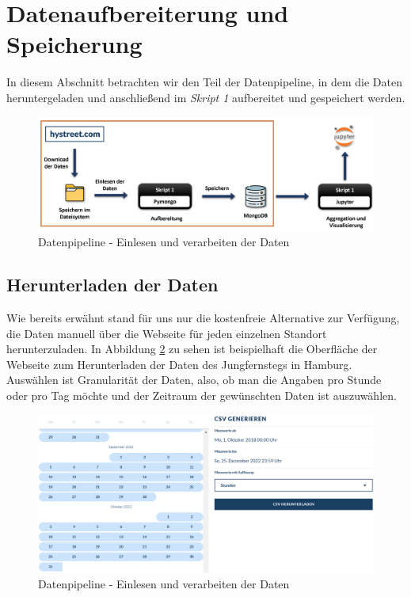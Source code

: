 \section{Datenaufbereiterung und Speicherung}
In diesem Abschnitt betrachten wir den Teil der Datenpipeline, in dem die Daten heruntergeladen und anschließend im \emph{Skript 1} aufbereitet und gespeichert werden.

\begin{figure}[h!]
    \vspace{0.7cm}
    \centering
    \includegraphics[width=0.8\linewidth]{images/datenpipelineT1.png}
    \caption{Datenpipeline - Einlesen und verarbeiten der Daten}
    \label{fig:datenpipelineT1}
\end{figure}

\subsection{Herunterladen der Daten}
Wie bereits erwähnt stand für uns nur die kostenfreie Alternative zur Verfügung, die Daten manuell über die Webseite für jeden einzelnen Standort herunterzuladen. In Abbildung \ref{fig:hystreet-download} zu sehen ist beispielhaft die Oberfläche der Webseite zum Herunterladen der Daten des Jungfernstegs in Hamburg. Auswählen ist Granularität der Daten, also, ob man die Angaben pro Stunde oder pro Tag möchte und der Zeitraum der gewünschten Daten ist auszuwählen.

\begin{figure}[h!]
    \vspace{0.6cm}
    \centering
    \includegraphics[width=0.9\linewidth]{images/hystreet-datendownload.png}
    \caption{Datenpipeline - Einlesen und verarbeiten der Daten}
    \label{fig:hystreet-download}
    \vspace{0.1cm}
\end{figure}

